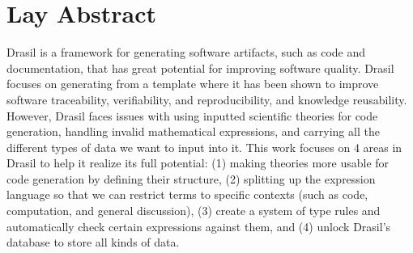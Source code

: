 \chapter{Lay Abstract}
\label{chap:lay_abstract}

Drasil is a framework for generating software artifacts, such as code and
documentation, that has great potential for improving software quality. Drasil
focuses on generating  from a  template where it has been
shown to improve software traceability, verifiability, and reproducibility, and
knowledge reusability. However, Drasil faces issues with using inputted
scientific theories for code generation, handling invalid mathematical
expressions, and carrying all the different types of data we want to input into
it. This work focuses on 4 areas in Drasil to help it realize its full
potential: (1) making theories more usable for code generation by defining their
structure, (2) splitting up the expression language so that we can restrict
terms to specific contexts (such as code, computation, and general discussion),
(3) create a system of type rules and automatically check certain expressions
against them, and (4) unlock Drasil's database to store all kinds of data.
